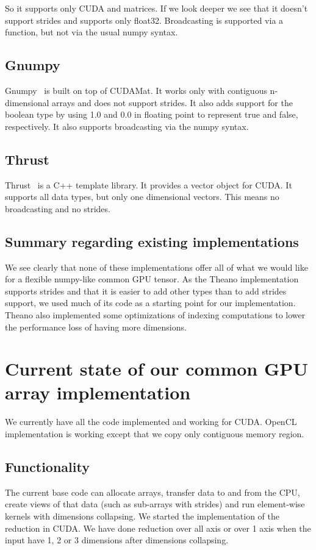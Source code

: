 \documentclass{article} %
\begin{document}
So it supports only CUDA and matrices. 
If we look deeper we see that it doesn't support strides and supports only float32. 
Broadcasting is supported via a function, but not via the usual numpy syntax.

\subsection{Gnumpy}
Gnumpy~\citep{gnumpy-TR2010} is built on top of CUDAMat.
It works only with contiguous n-dimensional arrays and does not support strides.
It also adds support for the boolean type by using 1.0 and 0.0 in floating point to represent true and false, respectively. 
It also supports broadcasting via the numpy syntax.

\subsection{Thrust}
Thrust~\citep{Thrust} is a C++ template library.
It provides a vector object for CUDA.
It supports all data types, but only one dimensional vectors.
This means no broadcasting and no strides.

\subsection{Summary regarding existing implementations}
We see clearly that none of these implementations offer all of what we would like for a flexible numpy-like common GPU tensor.
As the Theano implementation supports strides and that it is easier to add other types than to add strides support, we used much of its code as a starting point for our implementation.
Theano also implemented some optimizations of indexing computations to lower the performance loss of having more dimensions.

\section{Current state of our common GPU array implementation}
\label{sec:currentimpl}
We currently have all the code implemented and working for CUDA.
OpenCL implementation is working except that we copy only contiguous
memory region.

\subsection{Functionality}

The current base code can allocate arrays, transfer data to and from the CPU, create views of that data (such as sub-arrays with strides) and run element-wise kernels with dimensions collapsing. We started the implementation of the reduction in CUDA. We have done reduction over all axis or over 1 axis when the input have 1, 2 or 3 dimensions after dimensions collapsing.
\end{document}
